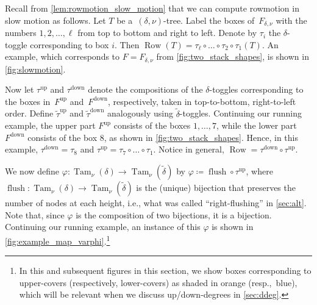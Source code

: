 \documentclass[11pt]{amsart}
\newcounter{height}
\newcommand{\altTam}[2]{\operatorname{Tam}_{#1}(#2)}
\newcommand{\up}{^{\operatorname{up}}}
\newcommand{\down}{^{\operatorname{down}}}
\DeclareMathOperator{\row}{Row}
\DeclareMathOperator{\flush}{flush}
\theoremstyle{definition}
\begin{document}
Recall from \cref{lem:rowmotion_slow_motion} that we can compute rowmotion in slow motion as follows. Let $T$ be a~$(\delta,\nu)$-tree. Label the boxes of~$F_{\delta,\nu}$ with the numbers $1,2,\dots,\ell$ from top to bottom and right to left. Denote by $\tau_i$ the $\delta$-toggle corresponding to box $i$. Then 
$\row(T)=\tau_\ell \circ \dots \circ \tau_2 \circ \tau_1(T)$.
An example, which corresponds to $F=F_{\delta,\nu}$ from \cref{fig:two_stack_shapes}, is shown in \cref{fig:slowmotion}.

Now let $\tau\up$ and $\tau\down$ denote the compositions of the $\delta$-toggles corresponding to the boxes in~$F\up$ and~$F\down$, respectively, taken in top-to-bottom, right-to-left order. Define $\widetilde \tau\up$ and $\widetilde \tau\down$ analogously using $\widetilde \delta$-toggles. Continuing our running example, the upper part $F\up$ consists of the boxes $1,\dots,7$, while the lower part $F\down$ consists of the box $8$, as shown in \cref{fig:two_stack_shapes}. Hence, in this example, $\tau\down=\tau_8$ and $\tau\up= \tau_7 \circ \dots \circ \tau_1$. Notice in general, $\row = \tau\down \circ \tau\up$.

We now define $\varphi\colon \altTam{\nu}{\delta} \to \altTam{\nu}{\widetilde \delta}$ by $\varphi \coloneqq \flush \circ \tau\up$, where $\flush\colon \altTam{\nu}{\delta} \to \altTam{\nu}{\widetilde \delta}$ is the (unique) bijection that preserves the number of nodes at each height, i.e., what was called ``right-flushing'' in \cref{sec:alt}. Note that, since $\varphi$ is the composition of two bijections, it is a bijection. Continuing our running example, an instance of this $\varphi$ is shown in \cref{fig:example_map_varphi}.\footnote{In this and subsequent figures in this section, we show boxes corresponding to upper-covers (respectively, lower-covers) as shaded in orange (resp.,~blue), which will be relevant when we discuss up/down-degrees in \cref{sec:ddeg}.}
\end{document}
